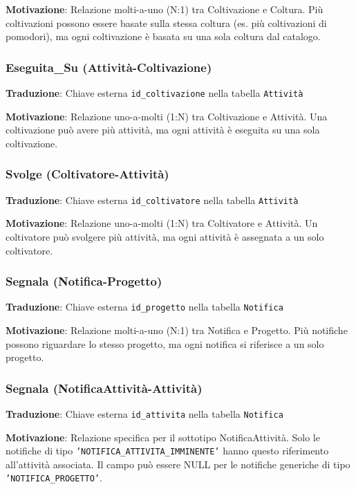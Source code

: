 \documentclass[12pt,a4paper]{article}
\begin{document}
\textbf{Motivazione}: Relazione molti-a-uno (N:1) tra Coltivazione e Coltura. Più coltivazioni possono essere basate sulla stessa coltura (es. più coltivazioni di pomodori), ma ogni coltivazione è basata su una sola coltura dal catalogo.

\subsubsection{Eseguita\_Su (Attività-Coltivazione)}

\textbf{Traduzione}: Chiave esterna \texttt{id\_coltivazione} nella tabella \texttt{Attività}

\textbf{Motivazione}: Relazione uno-a-molti (1:N) tra Coltivazione e Attività. Una coltivazione può avere più attività, ma ogni attività è eseguita su una sola coltivazione.

\subsubsection{Svolge (Coltivatore-Attività)}

\textbf{Traduzione}: Chiave esterna \texttt{id\_coltivatore} nella tabella \texttt{Attività}

\textbf{Motivazione}: Relazione uno-a-molti (1:N) tra Coltivatore e Attività. Un coltivatore può svolgere più attività, ma ogni attività è assegnata a un solo coltivatore.

\subsubsection{Segnala (Notifica-Progetto)}

\textbf{Traduzione}: Chiave esterna \texttt{id\_progetto} nella tabella \texttt{Notifica}

\textbf{Motivazione}: Relazione molti-a-uno (N:1) tra Notifica e Progetto. Più notifiche possono riguardare lo stesso progetto, ma ogni notifica si riferisce a un solo progetto.

\subsubsection{Segnala (NotificaAttività-Attività)}

\textbf{Traduzione}: Chiave esterna \texttt{id\_attivita} nella tabella \texttt{Notifica}

\textbf{Motivazione}: Relazione specifica per il sottotipo NotificaAttività. Solo le notifiche di tipo \texttt{'NOTIFICA\_ATTIVITA\_IMMINENTE'} hanno questo riferimento all'attività associata. Il campo può essere NULL per le notifiche generiche di tipo \texttt{'NOTIFICA\_PROGETTO'}.
\end{document}
